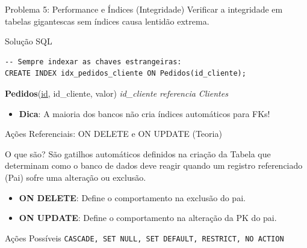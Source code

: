 \documentclass[9pt]{beamer}
\begin{document}
\begin{frame}[fragile]{Problema 5: Performance e Índices (Integridade)}
  \small
  Verificar a integridade em tabelas gigantescas sem índices causa lentidão extrema.
  \vspace{0.2cm}
  \centering
  \vspace{0.4cm}
  \begin{exampleblock}{Solução SQL}
\begin{lstlisting}
-- Sempre indexar as chaves estrangeiras:
CREATE INDEX idx_pedidos_cliente ON Pedidos(id_cliente);
\end{lstlisting}
  \end{exampleblock}
  \centering\scriptsize
  \textbf{Pedidos}(\underline{id}, \color{red}id\_cliente\color{black}, valor) \quad \textit{id\_cliente referencia Clientes}
  \vspace{0.2cm}
  \begin{itemize}
    \item \textbf{Dica}: A maioria dos bancos não cria índices automáticos para FKs!
  \end{itemize}
\end{frame}

\begin{frame}{Ações Referenciais: ON DELETE e ON UPDATE (Teoria)}
  \begin{block}{O que são?}
    São gatilhos automáticos definidos na criação da Tabela que determinam como o banco de dados deve reagir quando um registro referenciado (Pai) sofre uma alteração ou exclusão.
  \end{block}
  \vspace{0.3cm}
  \begin{itemize}
    \item \textbf{ON DELETE}: Define o comportamento na exclusão do pai.
    \item \textbf{ON UPDATE}: Define o comportamento na alteração da PK do pai.
  \end{itemize}
  \vspace{0.3cm}
  \begin{exampleblock}{Ações Possíveis}
    \lstinline|CASCADE, SET NULL, SET DEFAULT, RESTRICT, NO ACTION|
  \end{exampleblock}
\end{frame}
\end{document}
